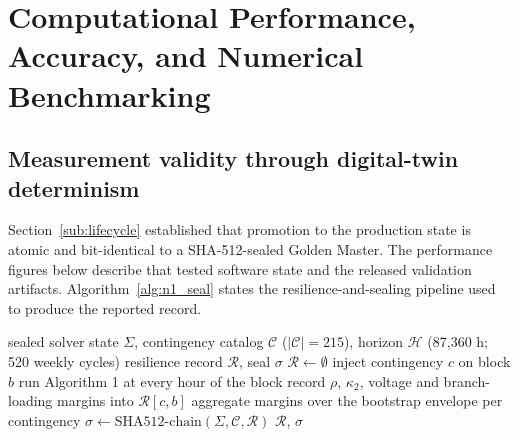 \section{Computational Performance, Accuracy, and Numerical Benchmarking}
\label{sec:benchmarking}

\subsection{Measurement validity through digital-twin determinism}
\label{sub:determinism}

Section~\ref{sub:lifecycle} established that promotion to the production state is atomic and bit-identical to a SHA-512-sealed Golden Master. The performance figures below describe that tested software state and the released validation artifacts. Algorithm~\ref{alg:n1_seal} states the resilience-and-sealing pipeline used to produce the reported record.

\begin{algorithm}[!t]
\caption{$N$--$1$ resilience sweep with 24-hour block bootstrap and SHA-512 sealing}
\label{alg:n1_seal}
\begin{algorithmic}[1]
\Require sealed solver state $\Sigma$, contingency catalog $\mathcal{C}$
         ($|\mathcal{C}| = 215$), horizon $\mathcal{H}$ (87,360 h; 520 weekly cycles)
\Ensure resilience record $\mathcal{R}$, seal $\sigma$
\State $\mathcal{R} \gets \emptyset$
 
    
      \State inject contingency $c$ on block $b$
      \State run Algorithm 1 at every hour of the block
      \State record $\rho$, $\kappa_2$, voltage and branch-loading margins into $\mathcal{R}[c, b]$
   \EndFor
\EndFor
\State aggregate margins over the bootstrap envelope per contingency
\State $\sigma \gets \mathrm{SHA512}\text{-chain}(\Sigma, \mathcal{C}, \mathcal{R})$ 
\State \Return $\mathcal{R}$, $\sigma$
\end{algorithmic}
\end{algorithm}

